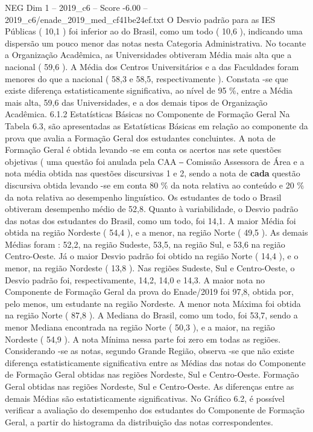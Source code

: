 \begin{textsample}{NEG Dim 1 – 2019\_c6 – Score -6.00 – 2019\_c6/enade\_2019\_med\_cf41be24ef.txt}
O Desvio padrão para as IES Públicas ( 10,1 ) foi inferior ao do Brasil, como um todo ( 10,6 ), indicando uma dispersão um pouco menor das notas nesta Categoria Administrativa.
No tocante a Organização Acadêmica, as Universidades obtiveram Média mais alta que a nacional ( 59,6 ).
A Média dos Centros Universitários e a das Faculdades foram menores do que a nacional ( 58,3 e 58,5, respectivamente ).
Constata -se que existe diferença estatisticamente significativa, ao nível de 95 \%, entre a Média mais alta, 59,6 das Universidades, e a dos demais tipos de Organização Acadêmica. 6.1.2 Estatísticas Básicas no Componente de Formação Geral Na Tabela 6.3, são apresentadas as Estatísticas Básicas em relação ao componente da prova que avalia a Formação Geral dos estudantes concluintes.
A nota de Formação Geral é obtida levando -se em conta os acertos nas sete questões objetivas ( uma questão foi anulada pela CAA ‒ Comissão Assessora de Área e a nota média obtida nas questões discursivas 1 e 2, sendo a nota de \textbf{cada} questão discursiva obtida levando -se em conta 80 \% da nota relativa ao conteúdo e 20 \% da nota relativa ao desempenho linguístico.
Os estudantes de todo o Brasil obtiveram desempenho médio de 52,8.
Quanto à variabilidade, o Desvio padrão das notas dos estudantes do Brasil, como um todo, foi 14,1.
A maior Média foi obtida na região Nordeste ( 54,4 ), e a menor, na região Norte ( 49,5 ).
As demais Médias foram : 52,2, na região Sudeste, 53,5, na região Sul, e 53,6 na região Centro-Oeste.
Já o maior Desvio padrão foi obtido na região Norte ( 14,4 ), e o menor, na região Nordeste ( 13,8 ).
Nas regiões Sudeste, Sul e Centro-Oeste, o Desvio padrão foi, respectivamente, 14,2, 14,0 e 14,3.
A maior nota no Componente de Formação Geral da prova do Enade/2019 foi 97,8, obtida por, pelo menos, um estudante na região Nordeste.
A menor nota Máxima foi obtida na região Norte ( 87,8 ).
A Mediana do Brasil, como um todo, foi 53,7, sendo a menor Mediana encontrada na região Norte ( 50,3 ), e a maior, na região Nordeste ( 54,9 ).
A nota Mínima nessa parte foi zero em todas as regiões.
Considerando -se as notas, segundo Grande Região, observa -se que não existe diferença estatisticamente significativa entre as Médias das notas do Componente de Formação Geral obtidas nas regiões Nordeste, Sul e Centro-Oeste.
Formação Geral obtidas nas regiões Nordeste, Sul e Centro-Oeste.
As diferenças entre as demais Médias são estatisticamente significativas.
No Gráfico 6.2, é possível verificar a avaliação do desempenho dos estudantes do Componente de Formação Geral, a partir do histograma da distribuição das notas correspondentes.

\end{textsample}
